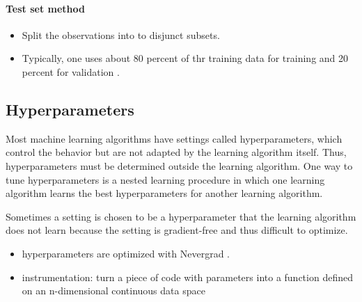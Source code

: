 \documentclass{scrartcl}
\begin{document}
\paragraph{Test set method} 
\begin{itemize}
\item Split the observations into to disjunct subsets.
\item Typically, one uses about 80 percent of thr training data for training and 20 percent for validation \cite{Goodfellow2016}. 
\end{itemize}




\subsection{Hyperparameters}

Most machine learning algorithms have settings called hyperparameters, which control the behavior but are not adapted by the learning algorithm itself. Thus, hyperparameters must be determined outside the learning algorithm. One way to tune hyperparameters is a nested learning procedure in which one learning algorithm learns the best hyperparameters for another learning algorithm. 

Sometimes a setting is chosen to be a hyperparameter that the learning algorithm does not learn because the setting is gradient-free and thus difficult to optimize.  


\begin{itemize}
\item hyperparameters are optimized with Nevergrad \cite{nevergrad}.
\item instrumentation: turn a piece of code with parameters into a function defined on an n-dimensional continuous data space
\end{itemize}
\end{document}
